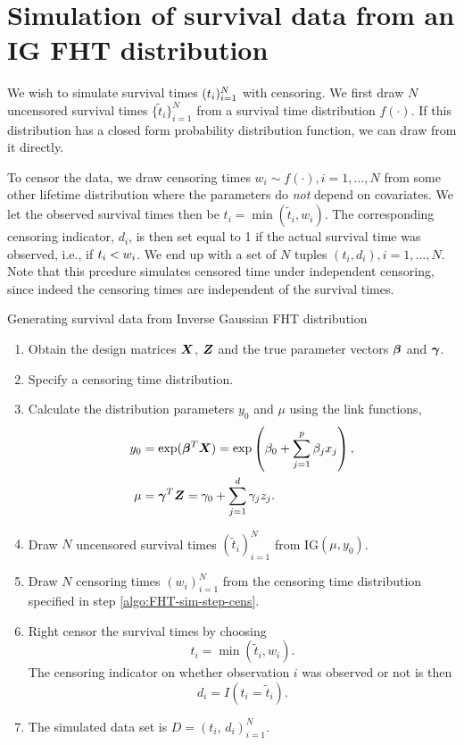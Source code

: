 \section{Simulation of survival data from an IG FHT distribution}\label{sec:simulate-IG-data}
We wish to simulate survival times $(t_{i})_{i=1}^N$ with censoring.
We first draw $N$ uncensored survival times $\{\tilde{t}_i\}_{i=1}^N$ from a survival time distribution $f(\cdot)$.
If this distribution has a closed form probability distribution function, we can draw from it directly.

To censor the data, we draw censoring times $w_i\sim f(\cdot),i=1,\ldots,N$ from some other lifetime distribution where the parameters do \textit{not} depend on covariates.
We let the observed survival times then be $t_i=\min(\tilde{t}_i,w_i)$.
The corresponding censoring indicator, $d_i$, is then set equal to 1 if the actual survival time was observed, i.e., if $t_{i}<w_i$.
We end up with a set of $N$ tuples $(t_i,d_i),i=1,\ldots,N$.
Note that this prcedure simulates censored time under independent censoring, since indeed the censoring times are independent of the survival times.

\begin{algorithm}
\caption{Generating survival data from Inverse Gaussian FHT distribution}
\label{algo:FHT-sim}
\begin{enumerate}
    \item Obtain the design matrices $\bm{X}$, $\bm{Z}$ and the true parameter vectors $\boldsymbol{\beta}$ and $\boldsymbol{\gamma}$.
    \item\label{algo:FHT-sim-step-cens} Specify a censoring time distribution.
    \item Calculate the distribution parameters $y_0$ and $\mu$ using the link functions,
        \begin{align*}
            y_0&=\exp(\boldsymbol{\beta}^T\bm{X})=\exp\left(\beta_0+\sum_{j=1}^p\beta_jx_j\right), \\
            \mu&=\boldsymbol{\gamma}^T\bm{Z}=\gamma_0+\sum_{j=1}^d\gamma_jz_j.
        \end{align*}
    \item Draw $N$ uncensored survival times $(\tilde{t}_i)_{i=1}^N$ from IG$(\mu,y_0)$.
    \item Draw $N$ censoring times $(w_i)_{i=1}^N$ from the censoring time distribution specified in step \ref{algo:FHT-sim-step-cens}.
    \item Right censor the survival times by choosing
            \begin{equation*}
                t_i=\min(\tilde{t}_i,w_i).
            \end{equation*}
          The censoring indicator on whether observation $i$ was observed or not is then
          \begin{equation*}
            d_i=I(t_i=\tilde{t}_i).
          \end{equation*}
    \item The simulated data set is $D=(t_i,\,d_i)_{i=1}^N$.
\end{enumerate}
\end{algorithm}

